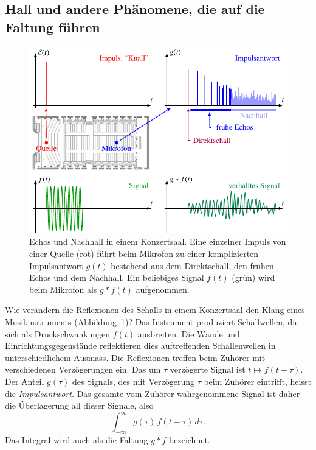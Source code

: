 \subsection{Hall und andere Phänomene, die auf die Faltung führen
\label{buch:gruppen:faltung:subsection:hall}}
\begin{figure}
\centering
\includegraphics{chapters/030-gruppen/images/konzertsaal.pdf}
\caption{Echos und Nachhall in einem Konzertsaal.
Eine einzelner Impuls von einer Quelle (rot) führt beim Mikrofon
zu einer komplizierten Impulsantwort $g(t)$ bestehend aus
dem Direktschall, den frühen Echos und dem Nachhall.
Ein beliebiges Signal $f(t)$ (grün) wird beim Mikrofon als $g*f(t)$
aufgenommen.
\label{buch:gruppen:faltung:fig:konzertsaal}}
\end{figure}
Wie verändern die Reflexionen des Schalls in einem Konzertsaal
den Klang eines Musikinstruments
(Abbildung~\ref{buch:gruppen:faltung:fig:konzertsaal})?
Das Instrument produziert Schallwellen, die sich als Druckschwankungen
$f(t)$ ausbreiten.
Die Wände und Einrichtungsgegenstände reflektieren dies auftreffenden
Schallenwellen in unterschiedlichem Ausmass.
Die Reflexionen treffen beim Zuhörer mit verschiedenen Verzögerungen ein.
Das um $\tau$ verzögerte Signal ist $t\mapsto f(t-\tau)$.
Der Anteil $g(\tau)$ des Signals, des mit Verzögerung $\tau$ beim
Zuhörer eintrifft, heisst die {\em Impulsantwort}.
Das gesamte vom Zuhörer wahrgenommene Signal ist daher die Überlagerung
all dieser Signale, also
\begin{equation}
\int_{-\infty}^\infty
g(\tau) 
\,
f(t-\tau)
\,d\tau.
\label{buch:gruppen:faltung:eqn:hall}
\end{equation}
Das Integral wird auch als die Faltung $g*f$ bezeichnet.

